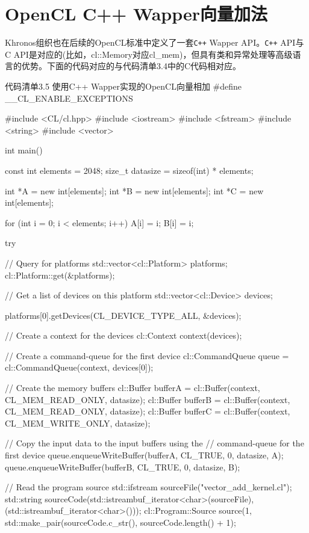 \section{OpenCL C++ Wapper向量加法}

Khronos组织也在后续的OpenCL标准中定义了一套\texttt{C++} Wapper API。\texttt{C++} API与C API是对应的(比如，cl::Memory对应cl\_\allowbreak{}mem)，但具有类和异常处理等高级语言的优势。下面的代码对应的与代码清单3.4中的C代码相对应。

\begin{codeboxt}[cpp]{代码清单3.5 使用C++ Wapper实现的OpenCL向量相加}
#define __CL_ENABLE_EXCEPTIONS

#include <CL/cl.hpp>
#include <iostream>
#include <fstream>
#include <string>
#include <vector>

int main(){
  const int elements = 2048;
  size_t datasize = sizeof(int) * elements;

  int *A = new int[elements];
  int *B = new int[elements];
  int *C = new int[elements];

  for (int i = 0; i < elements; i++){
    A[i] = i;
    B[i] = i;
  }

  try{
    // Query for platforms
    std::vector<cl::Platform> platforms;
    cl::Platform::get(&platforms);

    // Get a list of devices on this platform
    std::vector<cl::Device> devices;

    platforms[0].getDevices(CL_DEVICE_TYPE_ALL, &devices);

    // Create a context for the devices
    cl::Context context(devices);

    // Create a command-queue for the first device
    cl::CommandQueue queue = cl::CommandQueue(context, devices[0]);

    // Create the memory buffers
    cl::Buffer bufferA = cl::Buffer(context, CL_MEM_READ_ONLY, datasize);
    cl::Buffer bufferB = cl::Buffer(context, CL_MEM_READ_ONLY, datasize);
    cl::Buffer bufferC = cl::Buffer(context, CL_MEM_WRITE_ONLY, datasize);

    // Copy the input data to the input buffers using the
    // command-queue for the first device
    queue.enqueueWriteBuffer(bufferA, CL_TRUE, 0, datasize, A);
    queue.enqueueWriteBuffer(bufferB, CL_TRUE, 0, datasize, B);

    // Read the program source
    std::ifstream sourceFile("vector_add_kernel.cl");
    std::string sourceCode(std::istreambuf_iterator<char>(sourceFile), (std::istreambuf_iterator<char>()));
    cl::Program::Source source(1, std::make_pair(sourceCode.c_str(), sourceCode.length() + 1);

}}
\end{codeboxt}

